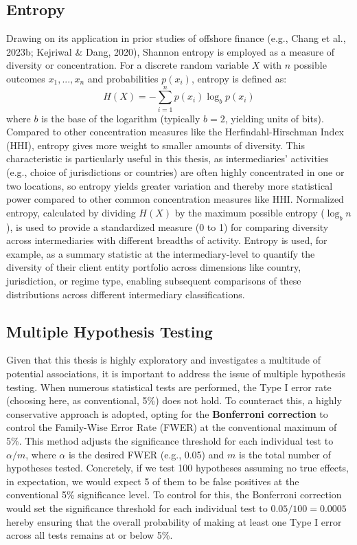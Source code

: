 \subsection{Entropy}
\label{subsec:entropy}
Drawing on its application in prior studies of offshore finance (e.g., Chang et al., 2023b; Kejriwal \& Dang, 2020), Shannon entropy is employed as a measure of diversity or concentration. For a discrete random variable $X$ with $n$ possible outcomes $x_1, ..., x_n$ and probabilities $p(x_i)$, entropy is defined as:
\begin{equation}
    H(X) = -\sum_{i=1}^{n} p(x_i) \log_b p(x_i)
\end{equation}
where $b$ is the base of the logarithm (typically $b=2$, yielding units of bits). Compared to other concentration measures like the Herfindahl-Hirschman Index (HHI), entropy gives more weight to smaller amounts of diversity. This characteristic is particularly useful in this thesis, as intermediaries' activities (e.g., choice of jurisdictions or countries) are often highly concentrated in one or two locations, so entropy yields greater variation and thereby more statistical power compared to other common concentration measures like HHI. Normalized entropy, calculated by dividing $H(X)$ by the maximum possible entropy ($\log_b n$), is used to provide a standardized measure (0 to 1) for comparing diversity across intermediaries with different breadths of activity. Entropy is used, for example, as a summary statistic at the intermediary-level to quantify the diversity of their client entity portfolio across dimensions like country, jurisdiction, or regime type, enabling subsequent comparisons of these distributions across different intermediary classifications.

\subsection{Multiple Hypothesis Testing}
\label{subsec:multiple_hypothesis_testing}
Given that this thesis is highly exploratory and investigates a multitude of potential associations, it is important to address the issue of multiple hypothesis testing. When numerous statistical tests are performed, the Type I error rate (choosing here, as conventional, 5\%) does not hold. To counteract this, a highly conservative approach is adopted, opting for the \textbf{Bonferroni correction} to control the Family-Wise Error Rate (FWER) at the conventional maximum of 5\%. This method adjusts the significance threshold for each individual test to $\alpha/m$, where $\alpha$ is the desired FWER (e.g., 0.05) and $m$ is the total number of hypotheses tested. Concretely, if we test 100 hypotheses assuming no true effects, in expectation, we would expect 5 of them to be false positives at the conventional 5\% significance level. To control for this, the Bonferroni correction would set the significance threshold for each individual test to $0.05/100 = 0.0005$ hereby ensuring that the overall probability of making at least one Type I error across all tests remains at or below 5\%.

